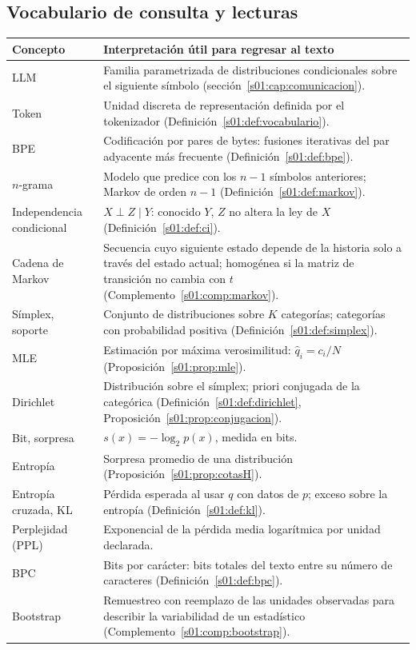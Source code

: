 \subsection{Vocabulario de consulta y lecturas}\label{s01:cap:vocabulario}
\begin{center}\small
\begin{tabularx}{\textwidth}{p{34mm}X}\toprule
Concepto & Interpretación útil para regresar al texto\\\midrule
LLM & Familia parametrizada de distribuciones condicionales sobre el siguiente símbolo (sección~\ref{s01:cap:comunicacion}).\\
Token & Unidad discreta de representación definida por el tokenizador (Definición~\ref{s01:def:vocabulario}).\\
BPE & Codificación por pares de bytes: fusiones iterativas del par adyacente más frecuente (Definición~\ref{s01:def:bpe}).\\
$n$-grama & Modelo que predice con los $n-1$ símbolos anteriores; Markov de orden $n-1$ (Definición~\ref{s01:def:markov}).\\
Independencia condicional & $X\perp Z\mid Y$: conocido $Y$, $Z$ no altera la ley de $X$ (Definición~\ref{s01:def:ci}).\\
Cadena de Markov & Secuencia cuyo siguiente estado depende de la historia solo a través del estado actual; homogénea si la matriz de transición no cambia con $t$ (Complemento~\ref{s01:comp:markov}).\\
Símplex, soporte & Conjunto de distribuciones sobre $K$ categorías; categorías con probabilidad positiva (Definición~\ref{s01:def:simplex}).\\
MLE & Estimación por máxima verosimilitud: $\widehat q_i=c_i/N$ (Proposición~\ref{s01:prop:mle}).\\
Dirichlet & Distribución sobre el símplex; priori conjugada de la categórica (Definición~\ref{s01:def:dirichlet}, Proposición~\ref{s01:prop:conjugacion}).\\
Bit, sorpresa & $s(x)=-\log_2p(x)$, medida en bits.\\
Entropía & Sorpresa promedio de una distribución (Proposición~\ref{s01:prop:cotasH}).\\
Entropía cruzada, KL & Pérdida esperada al usar $q$ con datos de $p$; exceso sobre la entropía (Definición~\ref{s01:def:kl}).\\
Perplejidad (PPL) & Exponencial de la pérdida media logarítmica por unidad declarada.\\
BPC & Bits por carácter: bits totales del texto entre su número de caracteres (Definición~\ref{s01:def:bpc}).\\
Bootstrap & Remuestreo con reemplazo de las unidades observadas para describir la variabilidad de un estadístico (Complemento~\ref{s01:comp:bootstrap}).\\\bottomrule
\end{tabularx}
\end{center}
